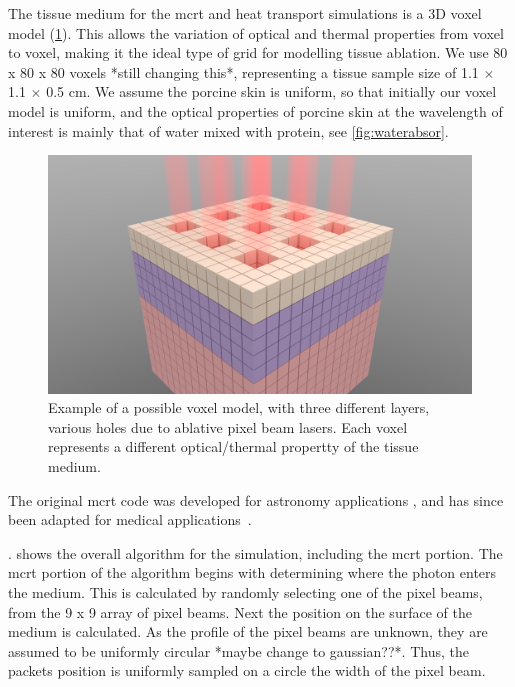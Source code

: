 The tissue medium for the \gls{mcrt} and heat transport simulations is a 3D voxel model (\cref{fig:voxel-model}). This allows the variation of optical and thermal properties from voxel to voxel, making it the ideal type of grid for modelling tissue ablation. We use  80 x 80 x 80 voxels *still changing this*, representing a tissue sample size of 1.1 $\times$ 1.1 $\times$ 0.5 cm. We assume the porcine skin is uniform, so that initially our voxel model is uniform, and the optical properties of porcine skin at the wavelength of interest is mainly that of water mixed with protein, see \cref{fig:waterabsor}.


\begin{figure}
\centering
\includegraphics[scale=0.25]{./ablation/images/voxel-model-render.png}
\caption{Example of a possible voxel model, with three different layers, various holes due to ablative pixel beam lasers. Each voxel represents a different optical/thermal propertty of the tissue medium.}\label{fig:voxel-model}
\end{figure}

The original \gls{mcrt} code was developed for astronomy applications \cite{wood1999model,wood2005estimating}, and has since been adapted for medical applications~\cite{campbell2015monte,barnard2018quantifying}.

. shows the overall algorithm for the simulation, including the \gls{mcrt} portion. 
The \gls{mcrt} portion of the algorithm begins with determining where the photon enters the medium. This is calculated by randomly selecting one of the pixel beams, from the 9 x 9 array of pixel beams. Next the position on the surface of the medium is calculated. As the profile of the pixel beams are unknown, they are assumed to be uniformly circular *maybe change to gaussian??*. Thus, the packets position is uniformly sampled on a circle the width of the pixel beam.

